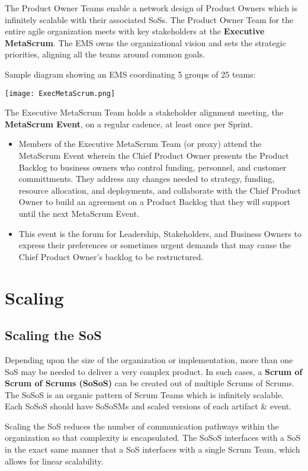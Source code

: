 \documentclass[12pt,a4paper,parskip=full]{scrartcl}
\begin{document}
The Product Owner Teams enable a network design of Product Owners which is infinitely scalable with their associated SoSs. The Product Owner Team for the entire agile organization meets with key stakeholders at the \textbf{Executive MetaScrum}. The EMS owns the organizational vision and sets the strategic priorities, aligning all the teams around common goals.

Sample diagram showing an EMS coordinating 5 groups of 25 teams:

\texttt{[image: ExecMetaScrum.png]}

The Executive MetaScrum Team holds a stakeholder alignment meeting, the \textbf{MetaScrum Event}, on a regular cadence, at least once per Sprint.

\begin{itemize}
	\item Members of the Executive MetaScrum Team (or proxy) attend the MetaScrum Event wherein the Chief Product Owner presents the Product Backlog to business owners who control funding, personnel, and customer committments. They address any changes needed to strategy, funding, resource allocation, and deployments, and collaborate with the Chief Product Owner to build an agreement on a Product Backlog that they will support until the next MetaScrum Event.
	\item This event is the forum for Leadership, Stakeholders, and Business Owners to express their preferences or sometimes urgent demands that may cause the Chief Product Owner's backlog to be restructured.
\end{itemize}

\section{Scaling}

\subsection{Scaling the SoS}

Depending upon the size of the organization or implementation, more than one SoS may be needed to deliver a very complex product. In such cases, a \textbf{Scrum of Scrum of Scrums (SoSoS)} can be created out of multiple Scrums of Scrums. The SoSoS is an organic pattern of Scrum Teams which is infinitely scalable. Each SoSoS should have SoSoSMs and scaled versions of each artifact \& event.

Scaling the SoS reduces the number of communication pathways within the organization so that complexity is encapsulated. The SoSoS interfaces with a SoS in the exact same manner that a SoS interfaces with a single Scrum Team, which allows for linear scalability.
\end{document}

